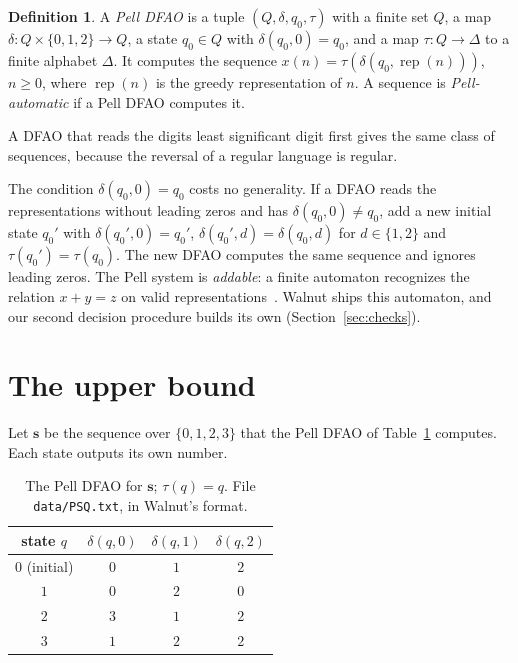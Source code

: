 \documentclass[11pt]{article}
\theoremstyle{definition}
\newtheorem{definition}[theorem]{Definition}
\theoremstyle{remark}
\newcommand{\PSQ}{\mathbf{s}}
\begin{document}
\begin{definition}\label{def:pell}
A \emph{Pell DFAO} is a tuple $(Q, \delta, q_0, \tau)$ with a finite set $Q$, a map $\delta : Q \times \{0,1,2\} \to Q$, a state $q_0 \in Q$ with $\delta(q_0, 0) = q_0$, and a map $\tau : Q \to \Delta$ to a finite alphabet $\Delta$. It computes the sequence $x(n) = \tau(\delta(q_0, \operatorname{rep}(n)))$, $n \ge 0$, where $\operatorname{rep}(n)$ is the greedy representation of $n$. A sequence is \emph{Pell-automatic} if a Pell DFAO computes it.
\end{definition}

A DFAO that reads the digits least significant digit first gives the same class of sequences, because the reversal of a regular language is regular.

The condition $\delta(q_0, 0) = q_0$ costs no generality. If a DFAO reads the representations without leading zeros and has $\delta(q_0, 0) \ne q_0$, add a new initial state $q_0'$ with $\delta(q_0', 0) = q_0'$, $\delta(q_0', d) = \delta(q_0, d)$ for $d \in \{1, 2\}$ and $\tau(q_0') = \tau(q_0)$. The new DFAO computes the same sequence and ignores leading zeros. The Pell system is \emph{addable}: a finite automaton recognizes the relation $x + y = z$ on valid representations~\cite[Section~2.2]{BS}. Walnut ships this automaton, and our second decision procedure builds its own (Section~\ref{sec:checks}).

\section{The upper bound}\label{sec:upper}

Let $\PSQ$ be the sequence over $\{0,1,2,3\}$ that the Pell DFAO of Table~\ref{tab:dfao} computes. Each state outputs its own number.

\begin{table}[ht]
\centering
\begin{tabular}{cccc}
\toprule
state $q$ & $\delta(q, 0)$ & $\delta(q, 1)$ & $\delta(q, 2)$ \\
\midrule
$0$ (initial) & $0$ & $1$ & $2$ \\
$1$ & $0$ & $2$ & $0$ \\
$2$ & $3$ & $1$ & $2$ \\
$3$ & $1$ & $2$ & $2$ \\
\bottomrule
\end{tabular}
\caption{The Pell DFAO for $\PSQ$; $\tau(q) = q$. File \texttt{data/PSQ.txt}, in Walnut's format.}
\label{tab:dfao}
\end{table}
\end{document}
